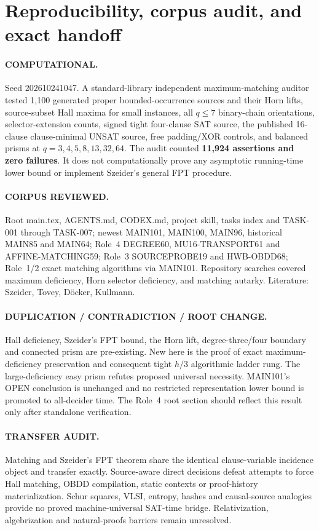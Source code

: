 \documentclass[11pt]{article}
\begin{document}
\section{Reproducibility, corpus audit, and exact handoff}
\paragraph{COMPUTATIONAL.}
Seed 202610241047. A standard-library independent maximum-matching auditor tested 1,100 generated proper bounded-occurrence sources and their Horn lifts, source-subset Hall maxima for small instances, all $q\le7$ binary-chain orientations, selector-extension counts, signed tight four-clause SAT source, the published 16-clause clause-minimal UNSAT source, free padding/XOR controls, and balanced prisms at $q=3,4,5,8,13,32,64$. The audit counted \textbf{11,924 assertions and zero failures}. It does not computationally prove any asymptotic running-time lower bound or implement Szeider's general FPT procedure.
\paragraph{CORPUS REVIEWED.}
Root main.tex, AGENTS.md, CODEX.md, project skill, tasks index and TASK-001 through TASK-007; newest MAIN101, MAIN100, MAIN96, historical MAIN85 and MAIN64; Role~4 DEGREE60, MU16-TRANSPORT61 and AFFINE-MATCHING59; Role~3 SOURCEPROBE19 and HWB-OBDD68; Role~1/2 exact matching algorithms via MAIN101. Repository searches covered maximum deficiency, Horn selector deficiency, and matching autarky. Literature: Szeider, Tovey, D\"ocker, Kullmann.
\paragraph{DUPLICATION / CONTRADICTION / ROOT CHANGE.}
Hall deficiency, Szeider's FPT bound, the Horn lift, degree-three/four boundary and connected prism are pre-existing. New here is the proof of exact maximum-deficiency preservation and consequent tight $h/3$ algorithmic ladder rung. The large-deficiency easy prism refutes proposed universal necessity. MAIN101's OPEN conclusion is unchanged and no restricted representation lower bound is promoted to all-decider time. The Role~4 root section should reflect this result only after standalone verification.
\paragraph{TRANSFER AUDIT.}
Matching and Szeider's FPT theorem share the identical clause-variable incidence object and transfer exactly. Source-aware direct decisions defeat attempts to force Hall matching, OBDD compilation, static contexts or proof-history materialization. Schur squares, VLSI, entropy, hashes and causal-source analogies provide no proved machine-universal SAT-time bridge. Relativization, algebrization and natural-proofs barriers remain unresolved.
\end{document}
